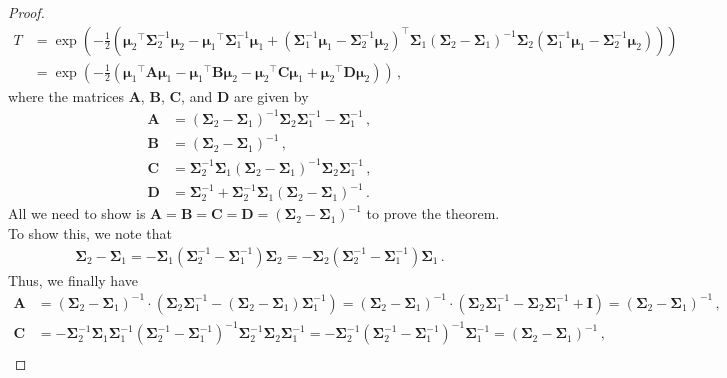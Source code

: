 \documentclass[a4paper]{article}
\newcommand{\bs}[1]{{\boldsymbol{#1}}}
\newcommand{\transpose}[1]{{#1}^\top}
\theoremstyle{definition}
\begin{document}
\begin{proof}
\begin{align*}
        T & = \exp \left( -\frac{1}{2} \left( \transpose{\bs{\mu}_2} \bs{\Sigma}^{-1}_2 \bs{\mu}_2 - \transpose{\bs{\mu}_1} \bs{\Sigma}^{-1}_1 \bs{\mu}_1 + \transpose{\left( \bs{\Sigma}^{-1}_1 \bs{\mu}_1 - \bs{\Sigma}^{-1}_2 \bs{\mu}_2 \right)} \bs{\Sigma}_1 \left( \bs{\Sigma}_2 - \bs{\Sigma}_1 \right)^{-1} \bs{\Sigma}_2 \left( \bs{\Sigma}^{-1}_1 \bs{\mu}_1 - \bs{\Sigma}^{-1}_2 \bs{\mu}_2 \right) \right) \right) \\
        & = \exp \left( -\frac{1}{2} \left( \transpose{\bs{\mu}_1} \bs{A} \bs{\mu}_1 - \transpose{\bs{\mu}_1} \bs{B} \bs{\mu}_2 - \transpose{\bs{\mu}_2} \bs{C} \bs{\mu}_1 + \transpose{\bs{\mu}_2} \bs{D} \bs{\mu}_2 \right) \right) \,,
    \end{align*}
    where the matrices $\bs{A}$, $\bs{B}$, $\bs{C}$, and $\bs{D}$ are given by
    \begin{align*}
        \bs{A} & = \left( \bs{\Sigma}_2 - \bs{\Sigma}_1 \right)^{-1} \bs{\Sigma}_2 \bs{\Sigma}^{-1}_1 -\bs{\Sigma}^{-1}_1 \,, \\
        \bs{B} & = \left( \bs{\Sigma}_2 - \bs{\Sigma}_1 \right)^{-1} \,, \\
        \bs{C} & = \bs{\Sigma}^{-1}_2 \bs{\Sigma}_1 \left( \bs{\Sigma}_2 - \bs{\Sigma}_1 \right)^{-1} \bs{\Sigma}_2 \bs{\Sigma}^{-1}_1 \,, \\
        \bs{D} & = \bs{\Sigma}^{-1}_2 + \bs{\Sigma}^{-1}_2 \bs{\Sigma}_1 \left( \bs{\Sigma}_2 - \bs{\Sigma}_1 \right)^{-1} \,. 
    \end{align*}
    All we need to show is $\bs{A} = \bs{B} = \bs{C} = \bs{D} = \left( \bs{\Sigma}_2 - \bs{\Sigma}_1 \right)^{-1}$ to prove the theorem. To show this, we note that 
    \begin{align}
        \bs{\Sigma}_2 - \bs{\Sigma}_1 = -\bs{\Sigma}_1 \left( \bs{\Sigma}_2^{-1} - \bs{\Sigma}_1^{-1} \right) \bs{\Sigma}_2 = -\bs{\Sigma}_2 \left( \bs{\Sigma}_2^{-1} - \bs{\Sigma}_1^{-1} \right) \bs{\Sigma}_1 \,. \label{eq:Sigma_diff}
    \end{align}
    Thus, we finally have
    \begin{align*}
        \bs{A} & = \left( \bs{\Sigma}_2 - \bs{\Sigma}_1 \right)^{-1} \cdot \left( \bs{\Sigma}_2 \bs{\Sigma}^{-1}_1 - \left( \bs{\Sigma}_2 - \bs{\Sigma}_1 \right) \bs{\Sigma}^{-1}_1 \right) = \left( \bs{\Sigma}_2 - \bs{\Sigma}_1 \right)^{-1} \cdot \left( \bs{\Sigma}_2 \bs{\Sigma}^{-1}_1 - \bs{\Sigma}_2 \bs{\Sigma}^{-1}_1 + \mathbf{I} \right) = \left( \bs{\Sigma}_2 - \bs{\Sigma}_1 \right)^{-1} \,, \\
        \bs{C} & = -\bs{\Sigma}^{-1}_2 \bs{\Sigma}_1 \bs{\Sigma}_1^{-1} \left( \bs{\Sigma}_2^{-1} - \bs{\Sigma}_1^{-1} \right)^{-1} \bs{\Sigma}_2^{-1} \bs{\Sigma}_2 \bs{\Sigma}^{-1}_1 = -\bs{\Sigma}^{-1}_2 \left( \bs{\Sigma}_2^{-1} - \bs{\Sigma}_1^{-1} \right)^{-1} \bs{\Sigma}^{-1}_1 =  \left( \bs{\Sigma}_2 - \bs{\Sigma}_1 \right)^{-1} \,, \\

\end{align*}
\end{proof}
\end{document}
